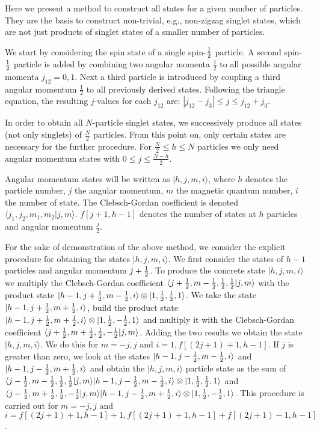 \documentclass[pra,amsfonts,showpacs,preprint,showkeys]{revtex4}
\begin{document}
Here we present a method to construct all states for a given
number of particles. They are the basis to construct non-trivial,
e.g., non-zigzag  singlet states, which are not just
products of singlet states of a smaller number of particles.


We start by considering the spin state of a single spin-${1\over
2}$ particle. A second spin-${1\over 2}$ particle is added by
combining two angular momenta $\frac{1}{2}$ to all possible
angular momenta $j_{12}=0,1$. Next a third particle is introduced
by coupling a third angular momentum $\frac{1}{2}$ to all
previously derived states. Following the triangle equation, the
resulting $j$-values for each $j_{12}$ are: $|j_{12}-j_3|\leq
j\leq j_{12}+j_3$.

In order to obtain all $N$-particle singlet states, we
successively produce all states (not only singlets) of
$\frac{N}{2}$ particles. From this point on, only certain states
are necessary for the further procedure. For $\frac{N}{2}\leq
h\leq N$ particles we only need angular momentum states with
$0\leq j\leq\frac{N-h}{2}$.

Angular momentum states will be written as
$|h,j,m,i\rangle$, where $h$ denotes the particle number, $j$ the
angular momentum, $m$ the magnetic quantum number, $i$ the number
of state. The Clebsch-Gordan coefficient is denoted $\langle
j_1,j_2,m_1,m_2|j,m\rangle$. $f[j+1,h-1]$ denotes the number of
states at $h$ particles and angular momentum $\frac{j}{2}$.

For the sake of demonstration of the above method, we consider the
explicit procedure for obtaining the states $|h,j,m,i\rangle $. We
first consider the states of $h-1$ particles and angular momentum
$j+{1\over2}$. To produce the concrete state $|h,j,m,i\rangle$ we
multiply the Clebsch-Gordan coefficient $\langle
j+{1\over2},m-{1\over2},{1\over2},{1\over2}|j,m\rangle$ with the
product state
$|h-1,j+{1\over2},m-{1\over2},i\rangle\otimes|1,{1\over2},{1\over2},1\rangle$.
We take the state $|h-1,j+{1\over2},m+{1\over2},i\rangle$, build
the product state
$|h-1,j+{1\over2},m+{1\over2},i\rangle\otimes|1,{1\over2},-{1\over2},1\rangle$
and multiply it with the Clebsch-Gordan coefficient $\langle
j+{1\over2},m+{1\over2},{1\over2},-{1\over2}|j,m\rangle$. Adding
the two results we obtain the state $|h,j,m,i\rangle$. We do this
for $m= -j,j$ and $i= 1, f[(2j+1)+1,h-1]$. If $j$ is greater than
zero, we look at the states
$|h-1,j-{1\over2},m-{1\over2},i\rangle$ and
$|h-1,j-{1\over2},m+{1\over2},i\rangle$ and obtain the
$|h,j,m,i\rangle$ particle state as the sum of $\langle
j-{1\over2},m-{1\over2},{1\over2},{1\over2}|j,m\rangle|h-1,j-{1\over2},m-{1\over2},i\rangle\otimes|1,{1\over2},{1\over2},1\rangle$
and $\langle
j-{1\over2},m+{1\over2},{1\over2},-{1\over2}|j,m\rangle|h-1,j-{1\over2},m+{1\over2},i\rangle\otimes|1,{1\over2},-{1\over2},1\rangle$.
This procedure is carried out for $m= -j,j$ and $i=
f[(2j+1)+1,h-1]+1,f[(2j+1)+1,h-1]+f[(2j+1)-1,h-1]$.
\end{document}

